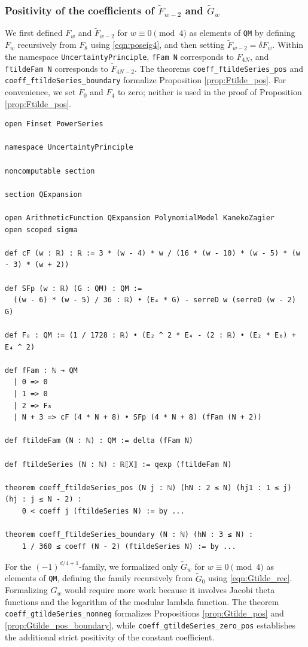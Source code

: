 \documentclass[10pt,reqno]{amsproc}
\newcommand{\wtilde}{\widetilde}
\newcommand{\1}{\mathds{1}}	%
\theoremstyle{definition}
\theoremstyle{remark}
\begin{document}
\subsubsection{Positivity of the coefficients of $\wtilde{F}_{w-2}$ and $\wtilde{G}_{w}$}


We first defined $F_w$ and $\wtilde{F}_{w-2}$ for $w \equiv 0 \pmod{4}$ as elements of \lstinline|QM| by defining $F_w$ recursively from $F_8$ using \eqref{eqn:poseig4}, and then setting $\wtilde{F}_{w-2}=\delta F_w$.
Within the namespace \lstinline|UncertaintyPrinciple|, \lstinline|fFam N| corresponds to $F_{4N}$, and \lstinline|ftildeFam N| corresponds to $\wtilde{F}_{4N-2}$.
The theorems \lstinline|coeff_ftildeSeries_pos| and \lstinline|coeff_ftildeSeries_boundary| formalize Proposition \ref{prop:Ftilde_pos}.
For convenience, we set $F_0$ and $F_4$ to zero; neither is used in the proof of Proposition \ref{prop:Ftilde_pos}.

\begin{lstlisting}[language=lean]
open Finset PowerSeries

namespace UncertaintyPrinciple

noncomputable section

section QExpansion

open ArithmeticFunction QExpansion PolynomialModel KanekoZagier
open scoped sigma

def cF (w : ℝ) : ℝ := 3 * (w - 4) * w / (16 * (w - 10) * (w - 5) * (w - 3) * (w + 2))

def SFp (w : ℝ) (G : QM) : QM :=
  ((w - 6) * (w - 5) / 36 : ℝ) • (E₄ * G) - serreD w (serreD (w - 2) G)

def F₈ : QM := (1 / 1728 : ℝ) • (E₂ ^ 2 * E₄ - (2 : ℝ) • (E₂ * E₆) + E₄ ^ 2)

def fFam : ℕ → QM
  | 0 => 0
  | 1 => 0
  | 2 => F₈
  | N + 3 => cF (4 * N + 8) • SFp (4 * N + 8) (fFam (N + 2))

def ftildeFam (N : ℕ) : QM := delta (fFam N)

def ftildeSeries (N : ℕ) : ℝ⟦X⟧ := qexp (ftildeFam N)

theorem coeff_ftildeSeries_pos (N j : ℕ) (hN : 2 ≤ N) (hj1 : 1 ≤ j) (hj : j ≤ N - 2) :
    0 < coeff j (ftildeSeries N) := by ...

theorem coeff_ftildeSeries_boundary (N : ℕ) (hN : 3 ≤ N) :
    1 / 360 ≤ coeff (N - 2) (ftildeSeries N) := by ...
\end{lstlisting}

For the $(-1)^{d/4+1}$-family, we formalized only $\wtilde{G}_w$ for $w \equiv 0 \pmod{4}$ as elements of \lstinline|QM|, defining the family recursively from $\wtilde{G}_0$ using \eqref{eqn:Gtilde_rec}.
Formalizing $G_w$ would require more work because it involves Jacobi theta functions and the logarithm of the modular lambda function.
The theorem \lstinline|coeff_gtildeSeries_nonneg| formalizes Propositions \ref{prop:Gtilde_pos} and \ref{prop:Gtilde_pos_boundary}, while \lstinline|coeff_gtildeSeries_zero_pos| establishes the additional strict positivity of the constant coefficient.
\end{document}
